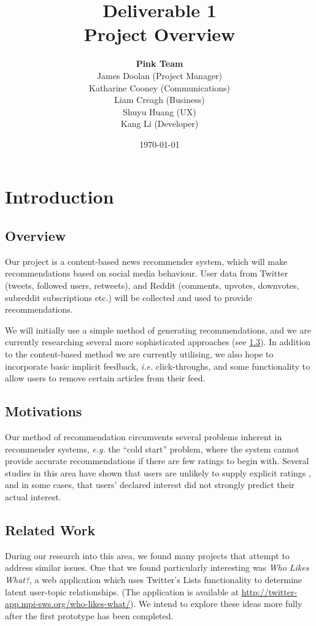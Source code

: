 \documentclass[11pt]{article}
\title{\Huge{Deliverable 1} \\ \huge{Project Overview}}
\author{\textbf{\Large{Pink Team}}\\ 
James Doolan (Project Manager)\\ 
Katharine Cooney (Communications)\\
Liam Creagh (Business)\\
Shuyu Huang (UX)\\
Kang Li (Developer)}
\date{\today}
\newcommand{\ie}{\emph{i.e.} }
\newcommand{\eg}{\emph{e.g.} }
\begin{document}
\maketitle

\section{Introduction}

\subsection{Overview}

Our project is a content-based news recommender system, which will make recommendations based on social media behaviour. User data from Twitter (tweets, followed users, retweets), and Reddit (comments, upvotes, downvotes, subreddit subscriptions etc.) will be collected and used to provide recommendations.

We will initially use a simple method of generating recommendations, and we are currently researching several more sophisticated approaches (see \cref{related_work}). In addition to the content-based method we are currently utilising, we also hope to incorporate basic implicit feedback, \ie click-throughs, and some functionality to allow users to remove certain articles from their feed.

\subsection{Motivations}

Our method of recommendation circumvents several problems inherent in recommender systems, \eg the ``cold start'' problem, where the system cannot provide accurate recommendations if there are few ratings to begin with. Several studies in this area have shown that users are unlikely to supply explicit ratings \cite{overview_recommender}, and in some cases, that users' declared interest did not strongly predict their actual interest.\cite{user_attitudes}

\subsection{Related Work}
\label{related_work}

During our research into this area, we found many projects that attempt to address similar issues. One that we found particularly interesting was \emph{Who Likes What?}, a web application which uses Twitter's Lists functionality to determine latent user-topic relationships\cite{who_likes_what}. (The application is available at \url{http://twitter-app.mpi-sws.org/who-likes-what/}). We intend to explore these ideas more fully after the first prototype has been completed.
\end{document}
